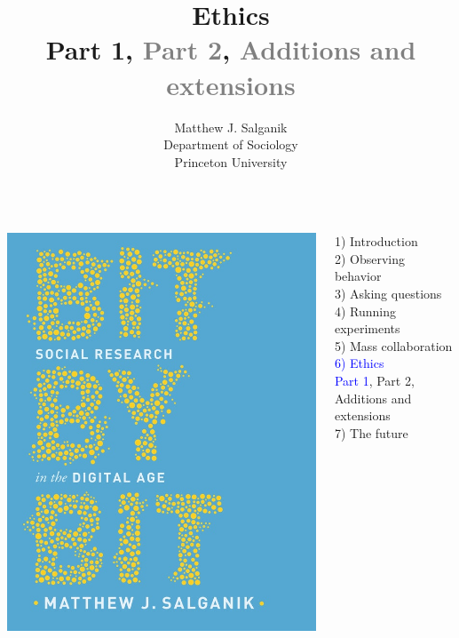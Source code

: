\documentclass{beamer}
\title[]{Ethics\\Part 1, \textcolor{gray}{Part 2}, \textcolor{gray}{Additions and extensions}}
\author[]{Matthew J. Salganik\\Department of Sociology\\Princeton University}
\date[]{%
\begin{flushright}
\texttt{[image: figures/cc-by.png]}
\end{flushright}
}
\begin{document}
\frame{\titlepage}
\begin{frame}

\begin{columns}
\begin{column}{.40\textwidth}
\includegraphics[width=\textwidth]{figures/salganik_bit_2018_cover}
\end{column}%

\hfill%

\begin{column}{.60\textwidth}
1) Introduction \\
2) Observing behavior \\
3) Asking questions \\
4) Running experiments \\
5) Mass collaboration \\
\textcolor{blue}{6) Ethics} \\
\textcolor{blue}{Part 1}, Part 2, Additions and extensions \\
7) The future \\
\end{column}%
\end{columns}

\end{frame}
\end{document}
